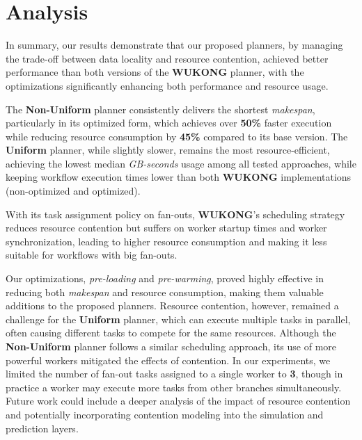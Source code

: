 \section{Analysis}
In summary, our results demonstrate that our proposed planners, by managing the trade-off between data locality and resource contention, achieved better performance than both versions of the \textbf{WUKONG} planner, with the optimizations significantly enhancing both performance and resource usage.

The \textbf{Non-Uniform} planner consistently delivers the shortest \textit{makespan}, particularly in its optimized form, which achieves over \textbf{50\%} faster execution while reducing resource consumption by \textbf{45\%} compared to its base version. The \textbf{Uniform} planner, while slightly slower, remains the most resource-efficient, achieving the lowest median \textit{GB-seconds} usage among all tested approaches, while keeping workflow execution times lower than both \textbf{WUKONG} implementations (non-optimized and optimized).

With its task assignment policy on fan-outs, \textbf{WUKONG}'s scheduling strategy reduces resource contention but suffers on worker startup times and worker synchronization, leading to higher resource consumption and making it less suitable for workflows with big fan-outs.

Our optimizations, \textit{pre-loading} and \textit{pre-warming}, proved highly effective in reducing both \textit{makespan} and resource consumption, making them valuable additions to the proposed planners. Resource contention, however, remained a challenge for the \textbf{Uniform} planner, which can execute multiple tasks in parallel, often causing different tasks to compete for the same resources. Although the \textbf{Non-Uniform} planner follows a similar scheduling approach, its use of more powerful workers mitigated the effects of contention. In our experiments, we limited the number of fan-out tasks assigned to a single worker to \textbf{3}, though in practice a worker may execute more tasks from other branches simultaneously. Future work could include a deeper analysis of the impact of resource contention and potentially incorporating contention modeling into the simulation and prediction layers.

